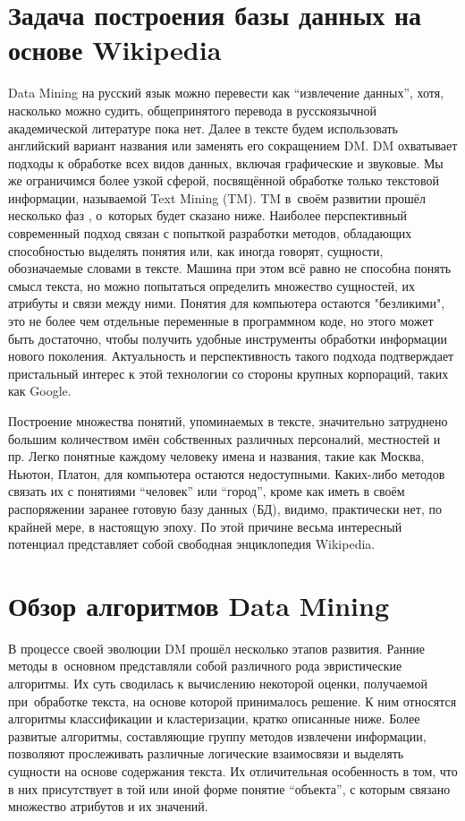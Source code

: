 \section {Задача построения базы данных на основе Wikipedia}

Data Mining на русский язык можно перевести как ``извлечение данных'',
хотя, насколько можно судить, общепринятого перевода в русскоязычной
академической литературе пока нет. Далее в тексте будем использовать
английский вариант названия или заменять его сокращением DM. 
DM охватывает подходы к обработке всех видов данных, включая графические и звуковые. 
Мы же ограничимся более узкой сферой, посвящённой
обработке только текстовой информации, называемой Text Mining (TM).
TM в~своём развитии прошёл несколько фаз \cite{text_mining_survey}, о~которых будет сказано ниже. 
Наиболее перспективный современный подход связан с попыткой разработки методов, обладающих
способностью выделять понятия или, как иногда говорят, сущности, обозначаемые словами в тексте. 
Машина при этом всё равно не способна 
понять смысл текста, но можно попытаться определить множество
сущностей, их атрибуты и связи между ними. Понятия для компьютера
остаются "безликими", это не более чем отдельные переменные в
программном коде, но этого может быть достаточно, чтобы получить
удобные инструменты обработки информации нового
поколения. Актуальность и перспективность такого подхода подтверждает
пристальный интерес к этой технологии со стороны крупных корпораций,
таких как Google.

Построение множества понятий, упоминаемых в тексте, значительно
затруднено большим количеством имён собственных различных персоналий,
местностей и пр. Легко понятные каждому человеку имена и названия,
такие как Москва, Ньютон, Платон, для компьютера остаются
недоступными. Каких-либо методов связать их с понятиями ``человек'' или
``город'', кроме как иметь в своём распоряжении заранее готовую базу
данных (БД), видимо, практически нет, по крайней мере, в настоящую эпоху. 
По этой причине весьма интересный потенциал представляет собой
свободная энциклопедия Wikipedia.


\section{Обзор алгоритмов Data Mining}

В процессе своей эволюции DM прошёл несколько этапов развития.
 Ранние методы в~основном представляли собой различного рода эвристические алгоритмы.
Их суть сводилась к вычислению некоторой оценки, получаемой
при~обработке текста, на основе которой принималось решение. К ним
относятся алгоритмы классификации и кластеризации, кратко описанные ниже. 
Более развитые алгоритмы, составляющие группу методов извлечени информации, 
позволяют прослеживать различные логические взаимосвязи и выделять сущности на основе содержания текста. 
Их отличительная особенность в том, что в них присутствует в той или иной форме понятие
``объекта'', с которым связано множество атрибутов и их значений.

